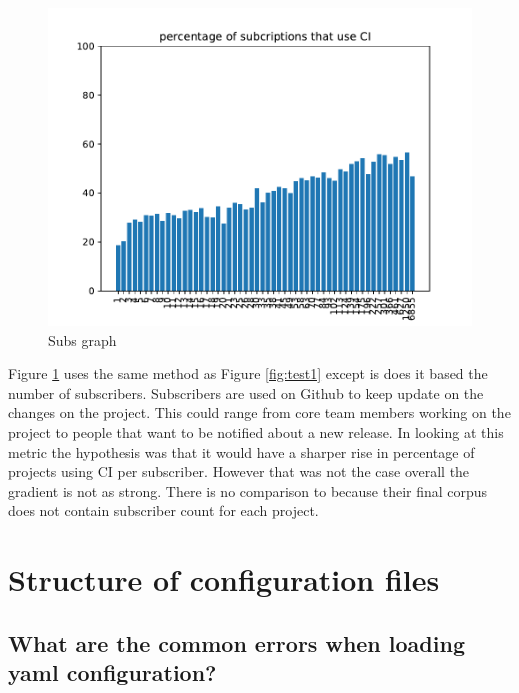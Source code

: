 \documentclass[twoside,12pt,titlepage,a4paper]{article}
\begin{document}
\begin{figure}[!h]
  \centering
  \includegraphics[width=.8\textwidth]{../src/results/percentage sub with CI.pdf}
  \caption{Subs graph}
  \label{graph_percentage_subs}
\end{figure}
Figure \ref{graph_percentage_subs} uses the same method as Figure \ref{fig:test1} except is does it based the number of subscribers. Subscribers are used on Github to keep update on the changes on the project. This could range from core team members working on the project to people that want to be notified about a new release. 
In looking at this metric the hypothesis was that it would have a sharper rise in percentage of projects using CI per subscriber. However that was not the case overall the gradient is not as strong. There is no comparison to \cite{Hilton2016} because their final corpus does not contain subscriber count for each project.



 
\pagebreak
\section{Structure of configuration files}

\vspace*{-0.05in}
\subsection{What are the common errors when loading yaml configuration?}
\vspace*{-0.05in}
\end{document}
